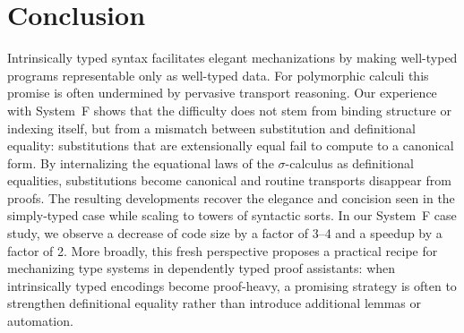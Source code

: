 \documentclass[manuscript,screen,review,anonymous,acmsmall]{acmart}
\begin{document}
% 
% 
% 
% 
% 


\section{Conclusion}
\label{sec:conclusions}

Intrinsically typed syntax facilitates elegant mechanizations by making
well-typed programs representable only as well-typed data. For
polymorphic calculi this promise is often undermined by pervasive
transport reasoning. Our experience with System~F
shows that the difficulty does not stem from binding structure or
indexing itself, but from a mismatch between substitution and
definitional equality: substitutions that are extensionally equal fail
to compute to a canonical form. By internalizing the equational laws of
the $\sigma$-calculus as definitional equalities, substitutions become
canonical and routine transports disappear from proofs. The resulting
developments recover the elegance and concision seen in the simply-typed case while
scaling to towers of syntactic sorts. In our System~F case study, we observe a decrease of
code size by a factor of 3--4 and a speedup by a factor of 2.
More broadly, this fresh perspective proposes a practical recipe
for mechanizing type systems in dependently typed proof assistants:
when intrinsically typed encodings become proof-heavy, a promising
strategy is often to strengthen definitional equality rather than
introduce additional lemmas or automation.




\end{document}
